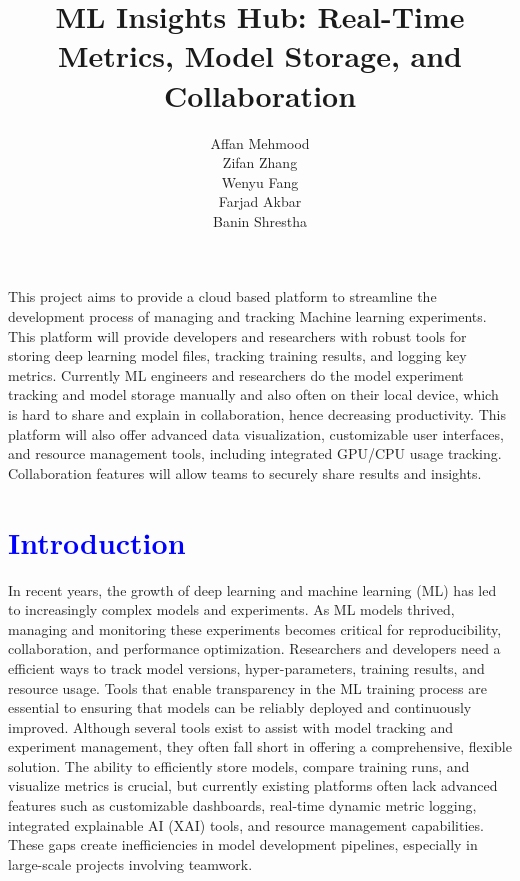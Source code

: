 \documentclass[12pt]{article}
\newcommand{\tb}{\textcolor{blue}}
\begin{document}
\title{ML Insights Hub: Real-Time Metrics, Model Storage, and Collaboration}


\author{
Affan Mehmood\\
Zifan Zhang\\
Wenyu Fang\\
Farjad Akbar\\
Banin Shrestha\\
}




\maketitle {}

\abstract This project aims to provide a cloud based platform to streamline the development process of managing and tracking Machine learning experiments. This platform will provide developers and researchers with robust tools for storing deep learning model files, tracking training results, and logging key metrics. Currently ML engineers and researchers do the model experiment tracking and model storage manually and also often on their local device, which is hard to share and explain in collaboration, hence decreasing productivity. This platform will also offer advanced data visualization, customizable user interfaces, and resource management tools, including integrated GPU/CPU usage tracking. Collaboration features will allow teams to securely share results and insights.

\section{\tb{Introduction}}

In recent years, the growth of deep learning and machine learning (ML) has led to increasingly complex models and experiments. As ML models thrived, managing and monitoring these experiments becomes critical for reproducibility, collaboration, and performance optimization. Researchers and developers need a efficient ways to track model versions, hyper-parameters, training results, and resource usage. Tools that enable transparency in the ML training process are essential to ensuring that models can be reliably deployed and continuously improved. 
Although several tools exist to assist with model tracking and experiment management, they often fall short in offering a comprehensive, flexible solution. The ability to efficiently store models, compare training runs, and visualize metrics is crucial, but currently existing platforms often lack advanced features such as customizable dashboards, real-time dynamic metric logging, integrated explainable AI (XAI) tools, and resource management capabilities. These gaps create inefficiencies in model development pipelines, especially in large-scale projects involving teamwork.
\end{document}
